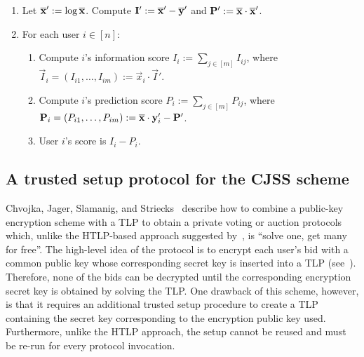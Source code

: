 \begin{enumerate}
    \item Let $\overline{\mathbf{x}}' := \log{\ensuremath{\overline{\mathbf{x}}}}$. Compute $\mathbf{I}' := \overline{\mathbf{x}}' - \overline{\mathbf{y}}'$ and $\mathbf{P}' := \overline{\mathbf{x}} \cdot \overline{\mathbf{x}}'$.
    \item For each user $i \in [n]$:
    \begin{enumerate}
        \item Compute $i$'s information score $I_i := \sum_{j \in [m]} I_{ij}$, where $\vec{I}_i = (I_{i1},\allowbreak \dots, I_{im}) := \vec{x}_i \cdot \vec{I}'$.
        \item Compute $i$'s prediction score $P_i := \sum_{j \in [m]} P_{ij}$, where $\mathbf{P}_i = (P_{i1},\allowbreak \dots, P_{im}) := \overline{\mathbf{x}} \cdot \mathbf{y}_i' - \mathbf{P}'$.
        \item User $i$'s score is $I_i - P_i$.
    \end{enumerate}
\end{enumerate}

\subsection{A trusted setup protocol for the CJSS scheme}\label{sec:seq_mpc_tlp}

Chvojka, Jager, Slamanig, and Striecks~\cite{ESORICS:CJSS21} describe how to combine a public-key encryption scheme with a TLP to obtain a private voting or auction protocols which, unlike the HTLP-based approach suggested by~\cite{C:MalThy19}, is ``solve one, get many for free''. The high-level idea of the protocol is to encrypt each user's bid with a common public key whose corresponding secret key is inserted into a TLP (see~). Therefore, none of the bids can be decrypted until the corresponding encryption secret key is obtained by solving the TLP. One drawback of this scheme, however, is that it requires an additional trusted setup procedure to create a TLP containing the secret key corresponding to the encryption public key used. Furthermore, unlike the HTLP approach, the setup cannot be reused and must be re-run for every protocol invocation.

